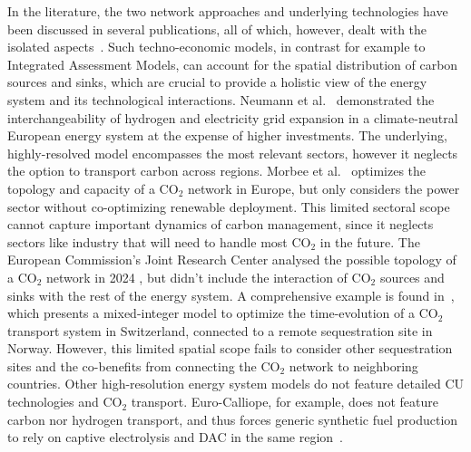 \documentclass[twocolumn]{article}
\newcommand{\carbon}{CO$_2$}
\begin{document}
In the literature, the two network approaches and underlying technologies have been discussed in several publications, all of which, however, dealt with the isolated aspects~\cite{bakkenLinearModelsOptimization2008,morbeeOptimisedDeploymentEuropean2012,stewartFeasibilityEuropeanwideIntegrated2014,oeiModelingCarbonCapture2014,elahiMultiperiodLeastCost2014,burandtDecarbonizingChinaEnergy2019,middletonSimCCSOpensourceTool2020,bjerketvedtOptimalDesignCost2020,weiProposedGlobalLayout2021,damoreOptimalDesignEuropean2021,becattiniCarbonDioxideCapture2022,neumannBenefitsHydrogenNetwork2022}. Such techno-economic models, in contrast for example to Integrated Assessment Models, can account for the spatial distribution of carbon sources and sinks, which are crucial to provide a holistic view of the energy system and its technological interactions. Neumann et al.~\cite{neumannBenefitsHydrogenNetwork2022} demonstrated the interchangeability of hydrogen and electricity grid expansion in a climate-neutral European energy system at the expense of higher investments. The underlying, highly-resolved model encompasses the most relevant sectors, however it neglects the option to transport carbon across regions.
Morbee et al.~\cite{morbeeOptimisedDeploymentEuropean2012} optimizes the topology and capacity of a \carbon{} network in Europe, but only considers the power sector without co-optimizing renewable deployment. This limited sectoral scope cannot capture important dynamics of carbon management, since it neglects sectors like industry that will need to handle most \carbon{} in the future.
The European Commission's Joint Research Center analysed the possible topology of a \carbon{} network in 2024 \cite{jrc2024}, but didn't include the interaction of  \carbon{} sources and sinks with the rest of the energy system.
A comprehensive example is found in~\cite{becattiniCarbonDioxideCapture2022}, which presents a mixed-integer model to optimize the time-evolution of a \carbon{} transport system in Switzerland, connected to a remote sequestration site in Norway. However, this limited spatial scope fails to consider other sequestration sites and the co-benefits from connecting the \carbon{} network to neighboring countries.
Other high-resolution energy system models do not feature detailed CU technologies and \carbon{} transport. Euro-Calliope, for example, does not feature carbon nor hydrogen transport, and thus forces generic synthetic fuel production to rely on captive electrolysis and DAC in the same region~\cite{pickeringDiversityOptionsEliminate2022}.
\end{document}
